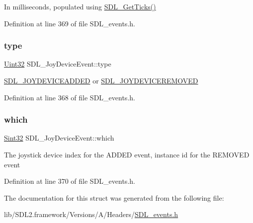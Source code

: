 In milliseconds, populated using \mbox{\hyperlink{_s_d_l__timer_8h_a0b9bc71d6287e0ffafdc3419760fe2b3}{S\+D\+L\+\_\+\+Get\+Ticks()}} 

Definition at line 369 of file S\+D\+L\+\_\+events.\+h.

\mbox{\label{struct_s_d_l___joy_device_event_a51f060ba1dd5669b458e9c97aece667e}} 
\subsubsection{\texorpdfstring{type}{type}}
{\footnotesize\ttfamily \mbox{\hyperlink{_s_d_l__stdinc_8h_add440eff171ea5f55cb00c4a9ab8672d}{Uint32}} S\+D\+L\+\_\+\+Joy\+Device\+Event\+::type}

\mbox{\hyperlink{_s_d_l__events_8h_a3b589e89be6b35c02e0dd34a55f3fccaa0500c4e830a1822e6d0a90294c3f1393}{S\+D\+L\+\_\+\+J\+O\+Y\+D\+E\+V\+I\+C\+E\+A\+D\+D\+ED}} or \mbox{\hyperlink{_s_d_l__events_8h_a3b589e89be6b35c02e0dd34a55f3fccaa4e2d7a1067dc56abeee393d46309ecd0}{S\+D\+L\+\_\+\+J\+O\+Y\+D\+E\+V\+I\+C\+E\+R\+E\+M\+O\+V\+ED}} 

Definition at line 368 of file S\+D\+L\+\_\+events.\+h.

\mbox{\label{struct_s_d_l___joy_device_event_af9b295798f033b799ebbda7de6cb5a7e}} 
\subsubsection{\texorpdfstring{which}{which}}
{\footnotesize\ttfamily \mbox{\hyperlink{_s_d_l__stdinc_8h_a7a90b941db9d4582e9ad7abb9940ff7e}{Sint32}} S\+D\+L\+\_\+\+Joy\+Device\+Event\+::which}

The joystick device index for the A\+D\+D\+ED event, instance id for the R\+E\+M\+O\+V\+ED event 

Definition at line 370 of file S\+D\+L\+\_\+events.\+h.



The documentation for this struct was generated from the following file\+:\begin{DoxyCompactItemize}
\item 
lib/\+S\+D\+L2.\+framework/\+Versions/\+A/\+Headers/\mbox{\hyperlink{_s_d_l__events_8h}{S\+D\+L\+\_\+events.\+h}}\end{DoxyCompactItemize}

